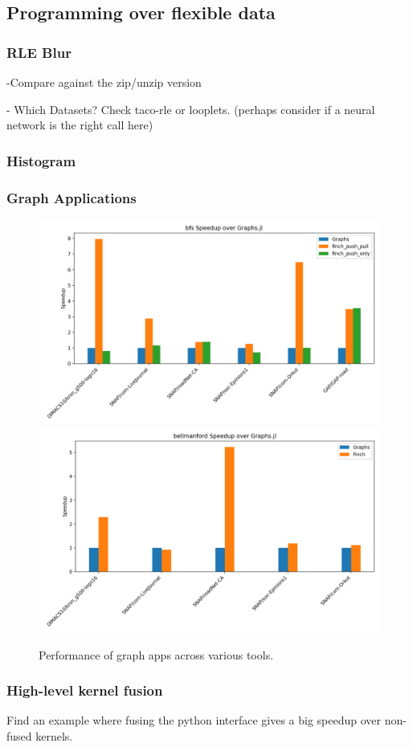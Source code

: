 \documentclass{article}
\begin{document}
\subsection{Programming over flexible data}

\subsubsection{RLE Blur}

-Compare against the zip/unzip version

- Which Datasets? Check taco-rle or looplets.
(perhaps consider if a neural network is the right call here)

\subsubsection{Histogram}


\subsubsection{Graph Applications}
\begin{figure}
	\includegraphics[width=\linewidth]{bfs_speedup_over_graphs.jl.png}
	\includegraphics[width=\linewidth]{bellmanford_speedup_over_graphs.jl.png}
    \caption{Performance of graph apps across various tools.}
\end{figure}

\subsubsection{High-level kernel fusion}
Find an example where fusing the python interface gives a big speedup over non-fused kernels.



\end{document}
